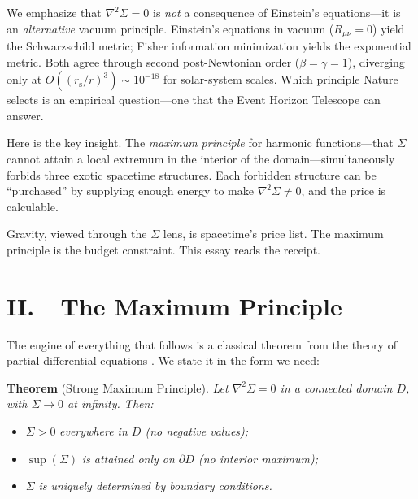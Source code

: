 \documentclass[12pt]{article}
\newcommand{\rs}{r_{\mathrm{s}}}
\begin{document}
We emphasize that $\nabla^2\Sigma = 0$ is \emph{not} a consequence of
Einstein's equations---it is an \emph{alternative} vacuum principle.
Einstein's equations in vacuum ($R_{\mu\nu} = 0$) yield the
Schwarzschild metric; Fisher information minimization yields the
exponential metric.  Both agree through second post-Newtonian order
($\beta = \gamma = 1$), diverging only at $O((\rs/r)^3) \sim 10^{-18}$
for solar-system scales.  Which principle Nature selects is an
empirical question---one that the Event Horizon Telescope can answer.

Here is the key insight. The \emph{maximum principle} for harmonic
functions---that $\Sigma$ cannot attain a local extremum in the interior
of the domain---simultaneously forbids three exotic spacetime structures.
Each forbidden structure can be ``purchased'' by supplying enough energy
to make $\nabla^2\Sigma \neq 0$, and the price is calculable.



Gravity, viewed through the $\Sigma$ lens, is spacetime's price list.
The maximum principle is the budget constraint. This essay reads the
receipt.


\section*{II.\ \ The Maximum Principle}

The engine of everything that follows is a classical theorem from the
theory of partial differential equations \cite{Evans2010}. We state it
in the form we need:




\noindent\textbf{Theorem} (Strong Maximum Principle).
\textit{Let\/ $\nabla^2\Sigma = 0$ in a connected domain\/ $D$, with\/
$\Sigma \to 0$ at infinity. Then:}

\begin{itemize}
\item[(i)] $\Sigma > 0$ \textit{everywhere in\/ $D$
(no negative values);}
\item[(ii)] $\sup(\Sigma)$ \textit{is attained only on\/
$\partial D$ (no interior maximum);}
\item[(iii)] $\Sigma$ \textit{is uniquely determined by boundary
conditions.}
\end{itemize}
\end{document}
